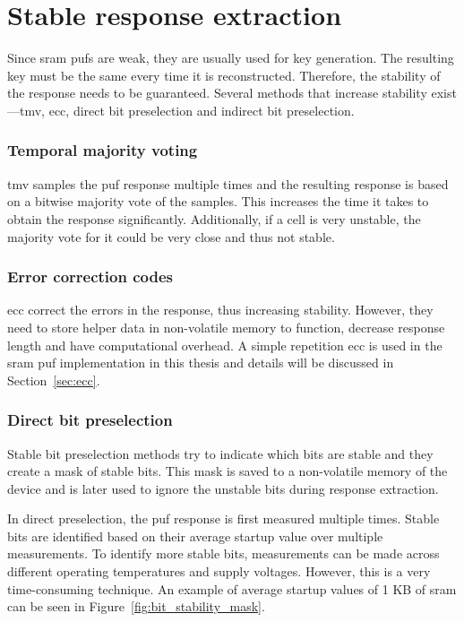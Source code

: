 \section{Stable response extraction}

Since \gls{sram} \glspl{puf} are weak, they are usually used for key generation. The resulting key must be the same every time it is reconstructed. Therefore, the stability of the response needs to be guaranteed. Several methods that increase stability exist---\gls{tmv}, \gls{ecc}, direct bit preselection and indirect bit preselection.\cite{Shifman2018}

\subsubsection*{Temporal majority voting}

 \gls{tmv} samples the \gls{puf} response multiple times and the resulting response is based on a bitwise majority vote of the samples. This increases the time it takes to obtain the response significantly. Additionally, if a cell is very unstable, the majority vote for it could be very close and thus not stable.

\subsubsection*{Error correction codes}

 \gls{ecc} correct the errors in the response, thus increasing stability. However, they need to store helper data in non-volatile memory to function, decrease response length and have computational overhead. A simple repetition \gls{ecc} is used in the \gls{sram} \gls{puf} implementation in this thesis and details will be discussed in Section~\ref{sec:ecc}.

\subsubsection*{Direct bit preselection}

Stable bit preselection methods try to indicate which bits are stable and they create a mask of stable bits. This mask is saved to a non-volatile memory of the device and is later used to ignore the unstable bits during response extraction.

In direct preselection, the \gls{puf} response is first measured multiple times. Stable bits are identified based on their average startup value over multiple measurements. To identify more stable bits, measurements can be made across different operating temperatures and supply voltages. However, this is a very time-consuming technique. An example of average startup values of 1 KB of \gls{sram} can be seen in Figure~\ref{fig:bit_stability_mask}.

